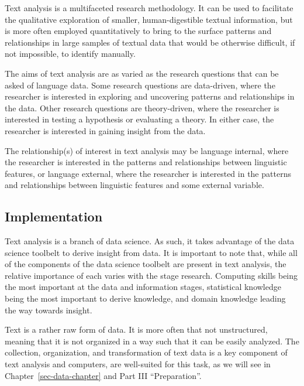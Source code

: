 \documentclass[
  letterpaper,
  krantz1]{latex/krantz-mod}
\theoremstyle{definition}
\theoremstyle{definition}
\theoremstyle{remark}
\begin{document}
Text analysis is a multifaceted research methodology. It can be used to
facilitate the qualitative exploration of
smaller, human-digestible textual information, but is more often
employed quantitatively to bring to the
surface patterns and relationships in large samples of textual data that
would be otherwise difficult, if not impossible, to identify manually.

The aims of text analysis are as varied as the
research questions that can be asked of language data. Some research
questions are data-driven, where the
researcher is interested in exploring and uncovering patterns and
relationships in the data. Other research questions are
theory-driven, where the researcher is
interested in testing a hypothesis or evaluating a
theory. In either case, the researcher is interested in gaining insight
from the data.

The relationship(s) of interest in text analysis may be language
internal, where the researcher is interested in the patterns and
relationships between linguistic features, or language external, where
the researcher is interested in the patterns and relationships between
linguistic features and some external variable.

\subsection{Implementation}\label{implementation}

Text analysis is a branch of data
science. As such, it takes advantage of the data
science toolbelt to derive insight from data. It is important to note
that, while all of the components of the data science toolbelt are
present in text analysis, the relative importance of each varies with
the stage research. Computing skills being the
most important at the data and information stages, statistical
knowledge being the most important to
derive knowledge, and domain knowledge leading
the way towards insight.

Text is a rather raw form of data. It is more often that not
unstructured, meaning that it is not organized
in a way such that it can be easily analyzed. The
collection, organization, and
transformation of text data is a key component
of text analysis and computers, are well-suited for this task, as we
will see in Chapter~\ref{sec-data-chapter} and Part III ``Preparation''.
\end{document}
